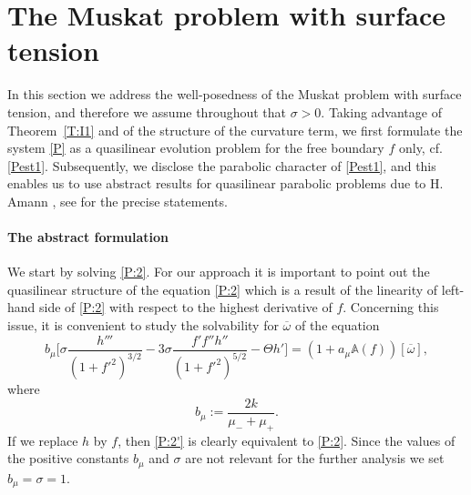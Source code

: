 \documentclass[11pt,reqno]{amsart}
\numberwithin{equation}{section}
\newcommand{\0}{\Omega}
\newcommand{\ov}{\overline}
\newcommand{\oo}{\ov\omega}
\newcommand{\bA}{\mathbb{A}}
\numberwithin{equation}{section}
\begin{document}
  






\section{The Muskat problem with surface tension}\label{Sec3}
In this section we address the well-posedness of the Muskat problem  with surface tension, and therefore we assume throughout   that $\sigma>0.$ 
Taking advantage of Theorem~\ref{T:I1} and of the structure of the curvature term, we first formulate the system \eqref{P}  as a quasilinear evolution problem for the free boundary $f$ only, cf. \eqref{Pest1}.
Subsequently, we disclose the parabolic character of \eqref{Pest1}, and this enables us to use  abstract results for  quasilinear parabolic problems due to H. Amann \cite{Am93, Am86, Am88}, see \cite[Theorem 1.5]{M16x} for the 
precise statements. \medskip

\paragraph{\bf The abstract formulation}
We start by solving \eqref{P:2}.
For our approach it is important to  point  out the quasilinear structure of the equation \eqref{P:2}  which is a result  of the linearity of left-hand side of \eqref{P:2} with respect to the highest  derivative of $f$.
Concerning  this issue, it is convenient to study the solvability for $\oo$ of the equation  
\begin{equation}\label{P:2'}
b_\mu\Big[\sigma \frac{h'''}{(1+f'^2)^{3/2}}-3\sigma\frac{f'{f''}h''}{(1+f'^2)^{5/2}}-\Theta h'\Big]=(1+a_\mu\bA(f))[\ov\omega],
\end{equation}
where
\[
b_\mu:=\frac{2k}{\mu_-+\mu_+}.
\]
 If we  replace $h$ by $f$, then \eqref{P:2'} is clearly equivalent to \eqref{P:2}.
 Since  the values of the positive constants $b_\mu$ and $\sigma$ are not relevant for the further analysis we set $b_\mu=\sigma=1$.  
\end{document}
